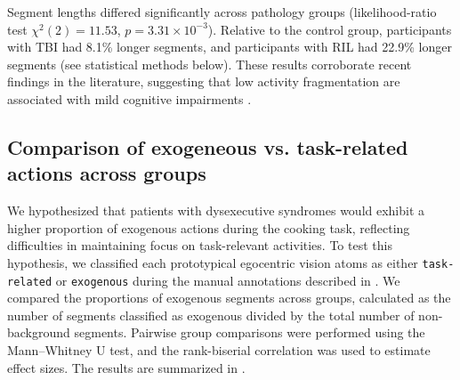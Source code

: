 \begin{chapterabstract}
        Segment lengths differed significantly across pathology groups (likelihood-ratio test $\chi^2(2)=11.53$, $p=3.31\times10^{-3}$). Relative to the control group, participants with TBI had 8.1\% longer segments, and participants with RIL had 22.9\% longer segments (see statistical methods below). These results corroborate recent findings in the literature, suggesting that low activity fragmentation \citep{10.1001/jamanetworkopen.2021.35168} are associated with mild cognitive impairments \cite{Khosla2025}. %
        
    \subsection{Comparison of exogeneous vs. task-related actions across groups}
        \label{sec:chapter_6_task_exo_discrimination}

        We hypothesized that patients with dysexecutive syndromes would exhibit a higher proportion of exogenous actions during the cooking task, reflecting difficulties in maintaining focus on task-relevant activities. To test this hypothesis, we classified each prototypical egocentric vision atoms as either \texttt{task-related} or \texttt{exogenous} during the manual annotations described in . We compared the proportions of exogenous segments across groups, calculated as the number of segments classified as exogenous divided by the total number of non-background segments. Pairwise group comparisons were performed using the Mann–Whitney U test, and the rank-biserial correlation was used to estimate effect sizes. The results are summarized in .


\end{chapterabstract}
